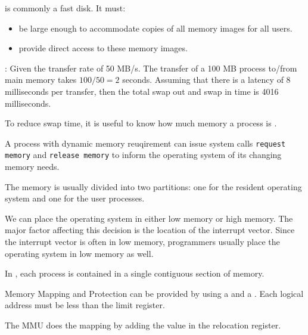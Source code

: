     \par {} is commonly a fast disk. It must:
    \begin{itemize}
      \item be large enough to accommodate copies of all memory images for all users.
      \item provide direct access to these memory images.
    \end{itemize}

    \par {}: Given the transfer rate of 50 MB/s. The transfer of a 100 MB process to/from main memory takes $100 / 50 = 2$ seconds. Assuming that there is a latency of 8 milliseconds per transfer, then the total swap out and swap in time is 4016 milliseconds.
    \par To reduce swap time, it is useful to know how much memory a process is .
    \par A process with dynamic memory reuqirement can issue system calls \lstinline{request memory} and \lstinline{release memory} to inform the operating system of its changing memory needs.


  {\footnotesize 
  \par The memory is usually divided into two partitions: one for the resident operating system and one for the user processes.
  \par We can place the operating system in either low memory or high memory. The major factor affecting this decision is the location of the interrupt vector. Since the interrupt vector is often in low memory, programmers usually place the operating system in low memory as well.
  }

  \par In , each process is contained in a single contiguous section of memory.

    \par Memory Mapping and Protection can be provided by using a  and a . Each logical address must be less than the limit register.
    \par The MMU does the mapping  by adding the value in the relocation register.


